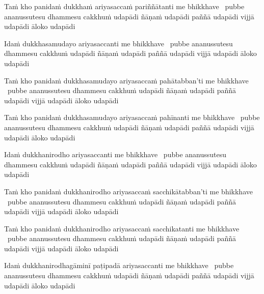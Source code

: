 \begin{pali-hang}
  Taṁ kho panidaṁ dukkhaṁ ariyasaccaṁ pariññātanti me bhikkhave \breathmark\ pubbe ananussutesu dhammesu cakkhuṁ udapādi ñāṇaṁ udapādi paññā udapādi vijjā udapādi āloko udapādi
\end{pali-hang}

\begin{pali-hang}
  Idaṁ dukkhasamudayo ariyasaccanti me bhikkhave \breathmark\ pubbe ananussutesu dhammesu cakkhuṁ udapādi ñāṇaṁ udapādi paññā udapādi vijjā udapādi āloko udapādi
\end{pali-hang}

\begin{pali-hang}
  Taṁ kho panidaṁ dukkhasamudayo ariyasaccaṁ pahātabban'ti me bhikkhave \breathmark\ pubbe ananussutesu dhammesu cakkhuṁ udapādi ñāṇaṁ udapādi paññā udapādi vijjā udapādi āloko udapādi
\end{pali-hang}

\begin{pali-hang}
  Taṁ kho panidaṁ dukkhasamudayo ariyasaccaṁ pahīnanti me bhikkhave \breathmark\ pubbe ananussutesu dhammesu cakkhuṁ udapādi ñāṇaṁ udapādi paññā udapādi vijjā udapādi āloko udapādi
\end{pali-hang}

\begin{pali-hang}
  Idaṁ dukkhanirodho ariyasaccanti me bhikkhave \breathmark\ pubbe ananussutesu dhammesu cakkhuṁ udapādi ñāṇaṁ udapādi paññā udapādi vijjā udapādi āloko udapādi
\end{pali-hang}

\begin{pali-hang}
  Taṁ kho panidaṁ dukkhanirodho ariyasaccaṁ sacchikātabban'ti me bhikkhave \breathmark\ pubbe ananussutesu dhammesu cakkhuṁ udapādi ñāṇaṁ udapādi paññā udapādi vijjā udapādi āloko udapādi
\end{pali-hang}

\begin{pali-hang}
  Taṁ kho panidaṁ dukkhanirodho ariyasaccaṁ sacchikatanti me bhikkhave \breathmark\ pubbe ananussutesu dhammesu cakkhuṁ udapādi ñāṇaṁ udapādi paññā udapādi vijjā udapādi āloko udapādi
\end{pali-hang}

\begin{pali-hang}
  Idaṁ dukkhanirodhagāminī paṭipadā ariyasaccanti me bhikkhave \breathmark\ pubbe ananussutesu dhammesu cakkhuṁ udapādi ñāṇaṁ udapādi paññā udapādi vijjā udapādi āloko udapādi
\end{pali-hang}

